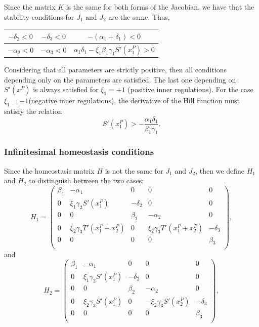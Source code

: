 Since the matrix $K$ is the same for both forms of the 
Jacobian, we have that the stability conditions for $J_1$ 
and $J_2$ are the same. Thus,
{
    \setlength{\tabcolsep}{10pt}
    \renewcommand{\arraystretch}{3.0}
\begin{table}[H]
    \centering
    \begin{tabular}{|c|c|c|}
        \hline
        $-\delta_2 < 0$ & $-\delta_3 < 0$ & $-(\alpha_1 + \delta_1) < 0$ \\
        \hline
        $-\alpha_2 < 0$ & $-\alpha_3 < 0$ & $\alpha_1 \delta_1 - \xi_1 \beta_1 \gamma_1 S'(x_1^P) > 0$\\
        \hline
    \end{tabular}
\end{table}
}

Considering that all parameters are strictly positive, then all
conditions depending only on the parameters are satisfied. The 
last one depending on $S'(x^P)$ is always satisfied for 
$\xi_1 = +1$ (positive inner regulations). For the case 
$\xi_1 = -1$(negative inner regulations), the derivative of the Hill function must satisfy 
the relation
\begin{equation}
    S'(x_1^P) > -\dfrac{\alpha_1 \delta_1}{\beta_1 \gamma_1}.
\end{equation} 

\subsubsection{Infinitesimal homeostasis conditions}

Since the homeostasis matrix $H$ is not the same for $J_1$
and $J_2$, then we define $H_1$ and $H_2$ to distinguish between 
the two cases:
\begin{equation}
    H_1 = 
    \begin{pmatrix}
        \beta_1 & -\alpha_1 & 0 & 0 & 0  \\
        0 & \xi_1\gamma_2 S'(x_1^P) & -\delta_2 & 0 & 0 \\
        0 & 0 & \beta_2 & -\alpha_2 & 0 \\
        0 & \xi_2 \gamma_3 T'(x_1^P + x_2^P) & 0 & \xi_2 \gamma_3 T'(x_1^P + x_2^P) & -\delta_3 \\
        0 & 0 & 0 & 0 & \beta_3 \\
    \end{pmatrix},
\end{equation}
and 
\begin{equation}
    H_2 = 
    \begin{pmatrix}
        \beta_1 & -\alpha_1 & 0 & 0 & 0 \\
        0 & \xi_1\gamma_2 S'(x_1^P) & -\delta_2 & 0 & 0 \\
        0 & 0 & \beta_2 & -\alpha_2 & 0 \\
        0 & \xi_2 \gamma_3 S'(x_1^P) & 0 & -\xi_2 \gamma_3 S'(x_2^P) & -\delta_3 \\
        0 & 0 & 0 & 0 & \beta_3 \\
    \end{pmatrix},
\end{equation}

